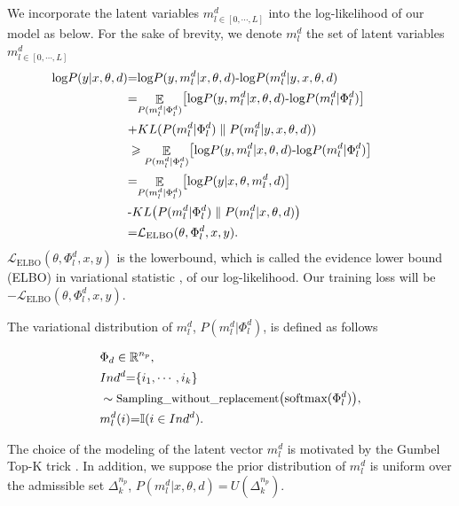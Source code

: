 \documentclass[11pt]{article}
\begin{document}
We incorporate the latent variables $m_{l\in[0,\cdots,L]}^d$ into the log-likelihood of our model as below. For the sake of brevity, we denote $m_l^d$ the set of latent variables $m_{l\in[0,\cdots,L]}^d$
\begin{align}
\hspace{-3.em}
\text{log} P(y|x,\theta,d) & \text{=} \text{log} P(y, m_l^d |x,\theta,d) \text{-} \text{log} P(m_l^d|y, x,\theta,d) \nonumber \\
& \text{=} \displaystyle{\mathop{\mathbb{E}}_{P(m_l^d | \Phi_l^d)}} \big[ \text{log} P(y, m_l^d | x,\theta,d) \text{-} \text{log} P(m_l^d | \Phi_l^d) \big] \nonumber \\
& \text{+} KL(P(m_l^d | \Phi_l^d) \parallel P(m_l^d|y, x,\theta,d)) \nonumber \\
& \geqslant \displaystyle{\mathop{\mathbb{E}}_{P(m_l^d | \Phi_l^d)}} \big[ \text{log} P(y, m_l^d | x,\theta,d) \text{-} \text{log} P(m_l^d | \Phi_l^d) \big] \nonumber \\
& \text{=} \displaystyle{\mathop{\mathbb{E}}_{P(m_l^d | \Phi_l^d)}} \big[ \text{log} P(y | x,\theta,m_l^d, d) \big] \label{eq:lower-bound} \\
& \text{-} KL \big( P(m_l^d | \Phi_l^d) \parallel P(m_l^d | x,\theta,d) \big) \nonumber \\
& \text{=} \mathcal{L}_{\text{ELBO}}(\theta, \Phi_l^d, x , y). \nonumber
\end{align}
$\mathcal{L}_{\text{ELBO}}(\theta, \Phi_l^d, x , y)$ is the lowerbound, which is called the evidence lower bound (ELBO) in variational statistic \citep{Diederick14auto}, of our log-likelihood. Our training loss will be $-\mathcal{L}_{\text{ELBO}}(\theta,\Phi_l^d,x,y)$.

The variational distribution of $m_l^d$, $P(m_l^d|\Phi_l^d)$, is defined as follows

\begin{align}
\hspace{-2.em}
&\Phi_d \in \mathbb{R}^{n_p} , \nonumber \\
&Ind^d \text{=}  \{ i_1, \cdots, i_k \} \nonumber \\
&\sim \text{\small Sampling\_without\_replacement} \big(\text{softmax}(\Phi_l^d) \big) , \nonumber \\
&m_l^d(i) \text{=} \mathbb{I}(i \in Ind^d) .\nonumber
\end{align}

The choice of the modeling of the latent vector $m_l^d$ is motivated by the Gumbel Top-K trick \citep{Kool19stochastic}. In addition, we suppose the prior distribution of $m_l^d$ is uniform over the admissible set $\Delta^{n_p}_k$, $P(m_l^d | x, \theta, d) \ \text{=} \ U(\Delta^{n_p}_k)$.
\end{document}
